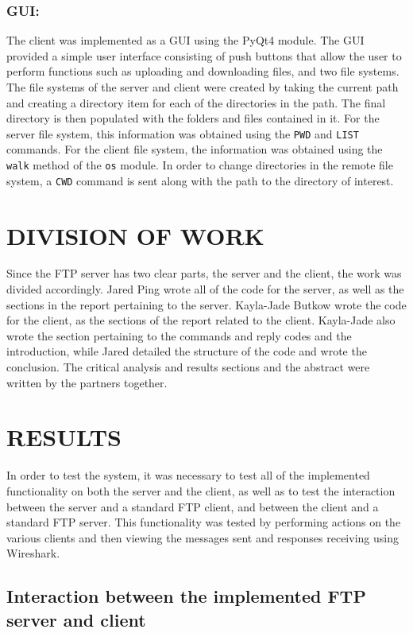 \documentclass[10pt,twocolumn]{witseiepaper}
\begin{document}
\subsubsection*{GUI:}
The client was implemented as a GUI using the PyQt4 module. The GUI provided a simple user interface consisting of push buttons that allow the user to perform functions such as uploading and downloading files, and two file systems. The file systems of the server and client were created by taking the current path and creating a directory item for each of the directories in the path. The final directory is then populated with the folders and files contained in it. For the server file system, this information was obtained using the \texttt{PWD} and \texttt{LIST} commands. For the client file system, the information was obtained using the \texttt{walk} method of the \texttt{os} module. In order to change directories in the remote file system, a \texttt{CWD} command is sent along with the path to the directory of interest.

\section{DIVISION OF WORK}
Since the FTP server has two clear parts, the server and the client, the work was divided accordingly. Jared Ping wrote all of the code for the server, as well as the sections in the report pertaining to the server. Kayla-Jade Butkow wrote the code for the client, as the sections of the report related to the client. Kayla-Jade also wrote the section pertaining to the commands and reply codes and the introduction, while Jared detailed the structure of the code and wrote the conclusion. The critical analysis and results sections and the abstract were written by the partners together.

\section{RESULTS} \label{sec:results}
In order to test the system, it was necessary to test all of the implemented functionality on both the server and the client, as well as to test the interaction between the server and a standard FTP client, and between the client and a standard FTP server. This functionality was tested by performing actions on the various clients and then viewing the messages sent and responses receiving using Wireshark.

\subsection{Interaction between the implemented FTP server and client}
\end{document}
